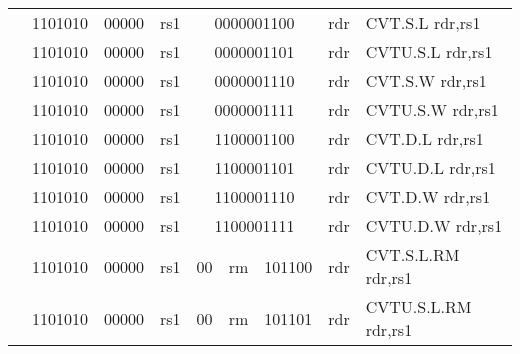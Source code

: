 \begin{table}[p]
\begin{small}
\begin{center}
\begin{tabular}{rcccccccccccl}
&
\multicolumn{2}{|c|}{1101010} &
\multicolumn{1}{c|}{00000} &
\multicolumn{1}{c|}{rs1} &
\multicolumn{6}{c|}{0000001100} &
\multicolumn{1}{c|}{rdr} & CVT.S.L rdr,rs1 \\
\cline{2-12}
  

&
\multicolumn{2}{|c|}{1101010} &
\multicolumn{1}{c|}{00000} &
\multicolumn{1}{c|}{rs1} &
\multicolumn{6}{c|}{0000001101} &
\multicolumn{1}{c|}{rdr} & CVTU.S.L rdr,rs1 \\
\cline{2-12}
  

&
\multicolumn{2}{|c|}{1101010} &
\multicolumn{1}{c|}{00000} &
\multicolumn{1}{c|}{rs1} &
\multicolumn{6}{c|}{0000001110} &
\multicolumn{1}{c|}{rdr} & CVT.S.W rdr,rs1 \\
\cline{2-12}
  

&
\multicolumn{2}{|c|}{1101010} &
\multicolumn{1}{c|}{00000} &
\multicolumn{1}{c|}{rs1} &
\multicolumn{6}{c|}{0000001111} &
\multicolumn{1}{c|}{rdr} & CVTU.S.W rdr,rs1 \\
\cline{2-12}
  

&
\multicolumn{2}{|c|}{1101010} &
\multicolumn{1}{c|}{00000} &
\multicolumn{1}{c|}{rs1} &
\multicolumn{6}{c|}{1100001100} &
\multicolumn{1}{c|}{rdr} & CVT.D.L rdr,rs1 \\
\cline{2-12}
  

&
\multicolumn{2}{|c|}{1101010} &
\multicolumn{1}{c|}{00000} &
\multicolumn{1}{c|}{rs1} &
\multicolumn{6}{c|}{1100001101} &
\multicolumn{1}{c|}{rdr} & CVTU.D.L rdr,rs1 \\
\cline{2-12}
  

&
\multicolumn{2}{|c|}{1101010} &
\multicolumn{1}{c|}{00000} &
\multicolumn{1}{c|}{rs1} &
\multicolumn{6}{c|}{1100001110} &
\multicolumn{1}{c|}{rdr} & CVT.D.W rdr,rs1 \\
\cline{2-12}
  

&
\multicolumn{2}{|c|}{1101010} &
\multicolumn{1}{c|}{00000} &
\multicolumn{1}{c|}{rs1} &
\multicolumn{6}{c|}{1100001111} &
\multicolumn{1}{c|}{rdr} & CVTU.D.W rdr,rs1 \\
\cline{2-12}
  

&
\multicolumn{2}{|c|}{1101010} &
\multicolumn{1}{c|}{00000} &
\multicolumn{1}{c|}{rs1} &
\multicolumn{1}{c|}{00} &
\multicolumn{2}{c|}{rm} &
\multicolumn{3}{c|}{101100} &
\multicolumn{1}{c|}{rdr} & CVT.S.L.RM rdr,rs1 \\
\cline{2-12}
  

&
\multicolumn{2}{|c|}{1101010} &
\multicolumn{1}{c|}{00000} &
\multicolumn{1}{c|}{rs1} &
\multicolumn{1}{c|}{00} &
\multicolumn{2}{c|}{rm} &
\multicolumn{3}{c|}{101101} &
\multicolumn{1}{c|}{rdr} & CVTU.S.L.RM rdr,rs1 \\
\cline{2-12}
  


\end{tabular}
\end{center}
\end{small}
\end{table}
